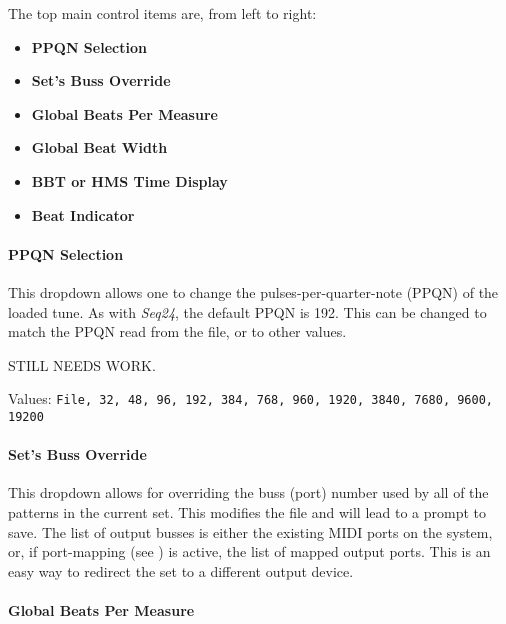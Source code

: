 \documentclass[
 11pt,
 twoside,
 a4paper,
 headinclude,
 footinclude,
 final                                 %
]{article}
\begin{document}
   The top main control items are, from left to right:

   \begin{itemize}
      \item \textbf{PPQN Selection}
      \item \textbf{Set's Buss Override}
      \item \textbf{Global Beats Per Measure}
      \item \textbf{Global Beat Width}
      \item \textbf{BBT or HMS Time Display}
      \item \textbf{Beat Indicator}
   \end{itemize}


\paragraph{PPQN Selection}
\label{paragraph:introduction_ppqn_selection}

   This dropdown allows one to change the pulses-per-quarter-note (PPQN) of the
   loaded tune.
   As with \textsl{Seq24}, the default PPQN is 192.  This can be changed to
   match the PPQN read from the file, or to other values.

   STILL NEEDS WORK.

   Values:
      \texttt{File, 32, 48, 96, 192, 384, 768, 960, 1920, 3840, 7680, 9600, 19200}

\paragraph{Set's Buss Override}
\label{paragraph:introduction_sets_buss_override}

   This dropdown allows for overriding the buss (port) number used by all of
   the patterns in the current set.  This modifies the file and will lead to a
   prompt to save.
   The list of
   output busses is either the existing MIDI ports on the system, or,
   if port-mapping (see ) is active, the list
   of mapped output ports.
   This is an easy way to redirect the set to a different output device.

\paragraph{Global Beats Per Measure}
\label{paragraph:introduction_global_beats_per_measure}
\end{document}
